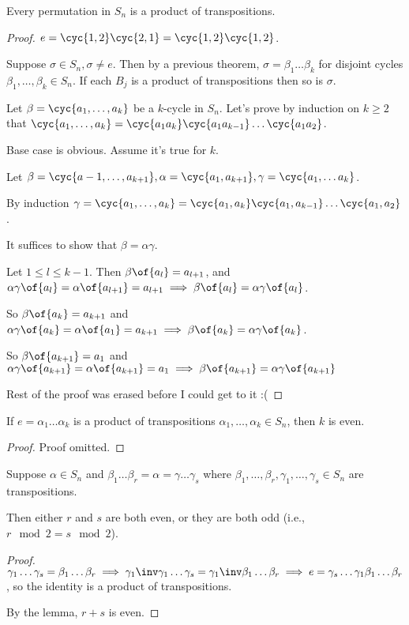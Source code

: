 \begin{theorem}
    Every permutation in $S_n$ is a product of transpositions.
\end{theorem}
\begin{proof}
    $e = \cyc{1,2}\cyc{2,1} = \cyc{1,2}\cyc{1,2}$.

    Suppose $\sigma \in S_n, \sigma \neq e$. Then by a previous theorem, $\sigma = \beta_1 \dots \beta_k$ for disjoint cycles $\beta_1, \dots, \beta_k \in S_n$. If each $B_j$ is a product of transpositions then so is $\sigma$.
    
    Let $\beta = \cyc{a_1, \dots, a_k}$ be a $k$-cycle in $S_n$. Let's prove by induction on $k \geq 2$ that $\cyc{a_1, \dots, a_k} = \cyc{a_1 a_k} \cyc{a_1 a_{k-1}} \dots \cyc{a_1 a_2}$.
    
    Base case is obvious. Assume it's true for $k$.
    
    Let $\beta = \cyc{a-1, \dots, a_{k+1}}, \alpha = \cyc{a_1, a_{k+1}}, \gamma = \cyc{a_1, \dots a_k}$.

    By induction $\gamma = \cyc{a_1, \dots, a_k} = \cyc{a_1, a_k}\cyc{a_1,a_{k-1}}\dots\cyc{a_1,a_2}$.

    It suffices to show that $\beta = \alpha \gamma$.
    
    Let $1 \leq l \leq k - 1$. Then $\beta\of{a_l} = a_{l+1}$, and $\alpha\gamma\of{a_l} = \alpha\of{a_{l+1}}=a_{l+1} \implies \beta\of{a_l} = \alpha\gamma\of{a_l}$.

    So $\beta\of{a_k} = a_{k+1}$ and $\alpha\gamma\of{a_k} = \alpha\of{a_1} = a_{k+1} \implies \beta\of{a_k} = \alpha\gamma\of{a_k}$.

    So $\beta\of{a_{k+1}} = a_1$ and $\alpha\gamma\of{a_{k+1}} = \alpha\of{a_{k+1}} = a_1 \implies \beta\of{a_{k+1}} = \alpha\gamma\of{a_{k+1}}$

    Rest of the proof was erased before I could get to it :(
\end{proof}

\begin{lemma}
    If $e = \alpha_1 \dots \alpha_k$ is a product of transpositions $\alpha_1, \dots, \alpha_k \in S_n$, then $k$ is even.
\end{lemma}
\begin{proof}
    Proof omitted.
\end{proof}

\begin{theorem}
    Suppose $\alpha \in S_n$ and $\beta_1 \dots \beta_r = \alpha = \gamma \dots \gamma_s$ where $\beta_1, \dots, \beta_r, \gamma_1, \dots, \gamma_s \in S_n$ are transpositions.

    Then either $r$ and $s$ are both even, or they are both odd (i.e., $r \mod 2 = s \mod 2$).
\end{theorem}
\begin{proof}
    $\gamma_1 \dots \gamma_s = \beta_1 \dots \beta_r \implies \gamma_1\inv \gamma_1 \dots \gamma_s = \gamma_1\inv\beta_1\dots \beta_r \implies e = \gamma_s \dots \gamma_1 \beta_1 \dots \beta_r$, so the identity is a product of transpositions.

    By the lemma, $r + s$ is even.
\end{proof}


